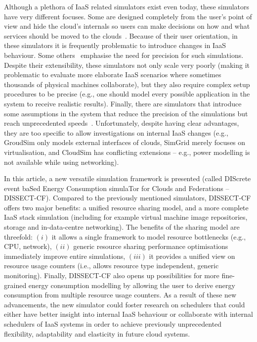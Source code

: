 \documentclass[sort, compress, 5p]{elsarticle}
\begin{document}
Although a plethora of IaaS related simulators exist even today, these simulators have very different focuses. Some are designed completely from the user's point of view and hide the cloud's internals so users can make decisions on how and what services should be moved to the clouds~\cite{SimGrid-Hirofuchi2013, iCanCloud-Nunez2011}. Because of their user orientation, in these simulators it is frequently problematic to introduce changes in IaaS behaviour. Some others~\cite{DCWorms-kurowski2013dcworms, GreenCloud-5683561} emphasise the need for precision for such simulations. Despite their extensibility, these simulators not only scale very poorly (making it problematic to evaluate more elaborate IaaS scenarios where sometimes thousands of physical machines collaborate), but they also require complex setup procedures to be precise (e.g., one should model every possible application in the system to receive realistic results). Finally, there are simulators that introduce some assumptions in the system that reduce the precision of the simulations but reach unprecedented speeds~\cite{CloudSim-calheiros2011CloudSim, SimGrid-Hirofuchi2013, GroudSim-ostermann2011groudsim}. Unfortunately, despite having clear advantages, they are  too specific to allow investigations on internal IaaS changes (e.g., GroudSim only models external interfaces of clouds, SimGrid merely focuses on virtualisation, and CloudSim has conflicting extensions -- e.g., power modelling is not available while using networking).

In this article, a new versatile simulation framework is presented (called DIScrete event baSed Energy Consumption simulaTor for Clouds and Federations -- DISSECT-CF). Compared to the previously mentioned simulators, DISSECT-CF offers two major benefits: a unified resource sharing model, and a more complete IaaS stack simulation (including for example virtual machine image repositories, storage and in-data-centre networking). The benefits of the sharing model are threefold: $(i)$ it allows a single framework to model resource bottlenecks (e.g., CPU, network), $(ii)$ generic resource sharing performance optimisations immediately improve entire simulations, $(iii)$ it provides a unified view on resource usage counters (i.e., allows resource type independent, generic monitoring). Finally, DISSECT-CF also opens up possibilities for more fine-grained energy consumption modelling by allowing the user to derive energy consumption from multiple resource usage counters. As a result of these new advancements, the new simulator could foster research on schedulers that could either have better insight into internal IaaS behaviour or collaborate with internal schedulers of IaaS systems in order to achieve previously unprecedented flexibility, adaptability and elasticity in future cloud systems.
\end{document}
